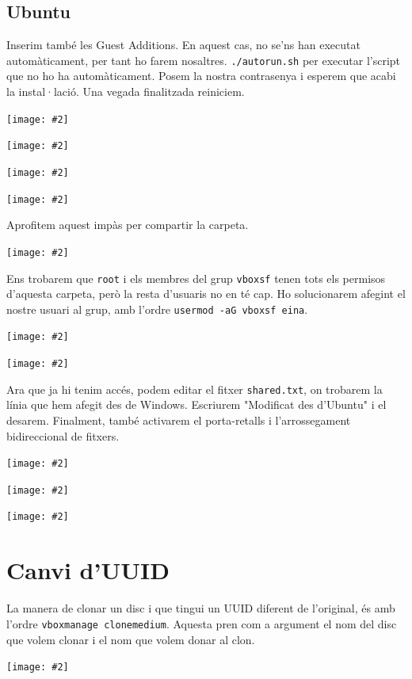 \documentclass[a4paper,12pt]{article}
\newcommand{\mygraphic}[2][width=0.9\textwidth]{\begin{center}
		\centering\texttt{[image: \#2]}\par
\end{center}}
\begin{document}
\subsection{Ubuntu}
Inserim també les Guest Additions. En aquest cas, no se'ns han executat automàticament, per tant ho farem nosaltres. \texttt{./autorun.sh} per executar l'script que no ho ha automàticament. Posem la nostra contrasenya i esperem que acabi la instal·lació. Una vegada finalitzada reiniciem.
\mygraphic[height=0.45\textheight]{imatges/h1.png}
\mygraphic[height=0.45\textheight]{imatges/h2.png}
\mygraphic[height=0.45\textheight]{imatges/h3.png}
\mygraphic[height=0.45\textheight]{imatges/h4.png}
Aprofitem aquest impàs per compartir la carpeta.
\mygraphic[height=0.45\textheight]{imatges/h5.png}
Ens trobarem que \texttt{root} i els membres del grup \texttt{vboxsf} tenen tots els permisos d'aquesta carpeta, però la resta d'usuaris no en té cap. Ho solucionarem afegint el nostre usuari al grup, amb  l'ordre \texttt{usermod -aG vboxsf eina}.
\mygraphic[height=0.44\textheight]{imatges/h6.png}
\mygraphic[height=0.44\textheight]{imatges/h7.png}
Ara que ja hi tenim accés, podem editar el fitxer \texttt{shared.txt}, on trobarem la línia que hem afegit des de Windows. Escriurem "Modificat des d'Ubuntu" i el desarem.
Finalment, també activarem el porta-retalls i l'arrossegament bidireccional de fitxers.
\mygraphic[height=0.45\textheight]{imatges/h8.png}
\mygraphic[height=0.45\textheight]{imatges/h10.png}
\mygraphic[height=0.45\textheight]{imatges/h11.png}

\newpage
\section{Canvi d'UUID}
La manera de clonar un disc i que tingui un UUID diferent de l'original, és amb l'ordre \texttt{vboxmanage clonemedium}. Aquesta pren com a argument el nom del disc que volem clonar i el nom que volem donar al clon.
\mygraphic{imatges/i1.png}
\end{document}
